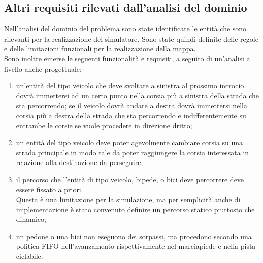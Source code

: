 \subsection{Altri requisiti rilevati dall'analisi del dominio}
Nell'analisi del dominio del problema sono state identificate le entità
che sono rilevanti per la realizzazione del simulatore. Sono state quindi
definite delle regole e delle limitazioni funzionali per la realizzazione della
mappa. \\
Sono inoltre emerse le seguenti funzionalità e requisiti, a seguito di
un'analisi a livello anche progettuale:
\begin{enumerate}
\item un'entità del tipo veicolo che deve svoltare a sinistra al prossimo
incrocio dovrà immettersi ad un certo punto nella corsia più a sinistra della
strada che sta percorrendo; se il veicolo dovrà andare a destra dovrà
immettersi nella corsia più a destra della strada che sta percorrendo e
indifferentemente su entrambe le corsie se vuole procedere in direzione dritto;
\item un entità del tipo veicolo deve poter agevolmente cambiare corsia su una
strada principale in modo tale da poter raggiungere la corsia interessata in
relazione alla destinazione da perseguire;
\item il percorso che l'entità di tipo veicolo, bipede, o bici deve percorrere
deve essere fissato a priori. \\
Questa è una limitazione per la simulazione, ma per semplicità anche di
implementazione è stato convenuto definire un percorso statico piuttosto che
dinamico;
\item un pedone o una bici non eseguono dei sorpassi, ma procedono secondo una
politica \ac{FIFO} nell'avanzamento rispettivamente nel marciapiede e nella
pista ciclabile.
\end{enumerate}

\newpage

